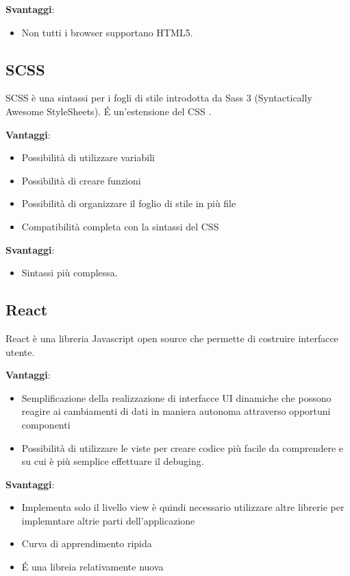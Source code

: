 \textbf{Svantaggi}: 
\begin{itemize}
	\item Non tutti i browser supportano HTML5.
\end{itemize}

\subsection{SCSS}

SCSS è una sintassi per i fogli di stile introdotta da Sass 3 (Syntactically Awesome StyleSheets). \'E un'estensione del CSS .

\textbf{Vantaggi}: 
\begin{itemize}
	\item Possibilità di utilizzare variabili
	\item Possibilità di creare funzioni 
	\item Possibilità di organizzare il foglio di stile in più file
	\item Compatibilità completa con la sintassi del CSS
\end{itemize}

\textbf{Svantaggi}: 
\begin{itemize}
	\item  Sintassi più complessa.
\end{itemize}

\subsection{React}

React è una libreria Javascript open source che permette di costruire interfacce utente. 

\textbf{Vantaggi}: 
\begin{itemize}
	\item Semplificazione della realizzazione di interfacce UI dinamiche che possono reagire ai cambiamenti di dati in maniera autonoma attraverso opportuni componenti
	\item Possibilità di utilizzare le viste per creare codice più facile da comprendere e su cui è più semplice effettuare il debuging.
	
\end{itemize}

\textbf{Svantaggi}: 
\begin{itemize}
	\item Implementa solo il livello view è quindi necessario utilizzare altre librerie per implemntare altrie parti dell'applicazione
	\item Curva di apprendimento ripida
	\item \'E una libreia relativamente nuova
\end{itemize}

